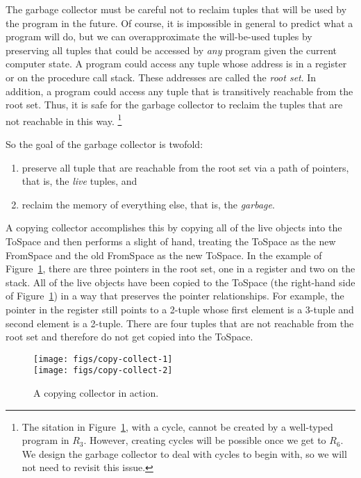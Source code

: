 \documentclass[11pt]{book}
\begin{document}
The garbage collector must be careful not to reclaim tuples that will
be used by the program in the future. Of course, it is impossible in
general to predict what a program will do, but we can overapproximate
the will-be-used tuples by preserving all tuples that could be
accessed by \emph{any} program given the current computer state.  A
program could access any tuple whose address is in a register or on
the procedure call stack. These addresses are called the \emph{root
  set}. In addition, a program could access any tuple that is
transitively reachable from the root set. Thus, it is safe for the
garbage collector to reclaim the tuples that are not reachable in this
way.
%
\footnote{The sitation in Figure~\ref{fig:copying-collector}, with a
  cycle, cannot be created by a well-typed program in $R_3$. However,
  creating cycles will be possible once we get to $R_6$.  We design
  the garbage collector to deal with cycles to begin with, so we will
  not need to revisit this issue.}

So the goal of the garbage collector is twofold:
\begin{enumerate}
\item preserve all tuple that are reachable from the root set via a
  path of pointers, that is, the \emph{live} tuples, and
\item reclaim the memory of everything else, that is, the
  \emph{garbage}.
\end{enumerate}
A copying collector accomplishes this by copying all of the live
objects into the ToSpace and then performs a slight of hand, treating
the ToSpace as the new FromSpace and the old FromSpace as the new
ToSpace.  In the example of Figure~\ref{fig:copying-collector}, there
are three pointers in the root set, one in a register and two on the
stack.  All of the live objects have been copied to the ToSpace (the
right-hand side of Figure~\ref{fig:copying-collector}) in a way that
preserves the pointer relationships. For example, the pointer in the
register still points to a 2-tuple whose first element is a 3-tuple
and second element is a 2-tuple.  There are four tuples that are not
reachable from the root set and therefore do not get copied into the
ToSpace.

\begin{figure}[tbp]
\centering
\texttt{[image: figs/copy-collect-1]} \\[5ex]
\texttt{[image: figs/copy-collect-2]}
\caption{A copying collector in action.}
\label{fig:copying-collector}
\end{figure}
\end{document}

